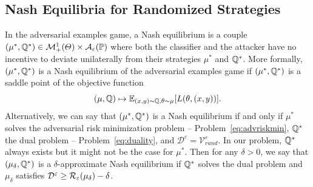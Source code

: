 \subsection{Nash Equilibria for Randomized Strategies}

In the adversarial examples game, a Nash equilibrium is a couple $(\mu^*,\mathbb{Q}^*)\in\mathcal{M}^1_+(\Theta)\times\mathcal{A}_\varepsilon(\mathbb{P})$ where both the classifier and the attacker have no incentive to deviate unilaterally from their strategies $\mu^*$ and $\mathbb{Q}^*$. More formally, $(\mu^*,\mathbb{Q}^*)$ is a Nash equilibrium of the adversarial examples game if $(\mu^*,\mathbb{Q}^*)$ is a saddle point of the objective function $$(\mu,\QQ)\mapsto \mathbb{E}_{(x,y)\sim\QQ,\theta\sim\mu}\left[\loss(\theta,(x,y))\right].$$ Alternatively, we can say that $(\mu^*,\mathbb{Q}^*)$ is a Nash equilibrium if and only if $\mu^*$ solves the adversarial risk minimization problem -- Problem~\eqref{eq:advriskmin}, $\mathbb{Q}^*$ the dual problem -- Problem~\eqref{eq:duality}, and $\mathcal{D}^\varepsilon=\mathcal{V}_{rand}^\varepsilon$. In our problem, $\mathbb{Q}^*$ always exists but it might not be the case for $\mu^*$. Then for any $\delta>0$, we say that  $(\mu_\delta,\mathbb{Q}^*)$ is a $\delta$-approximate Nash equilibrium if $\mathbb{Q}^*$ solves the dual problem and $\mu_\delta$ satisfies $\mathcal{D}^\varepsilon\geq\mathcal{R}_\varepsilon(\mu_\delta)-\delta$. 




